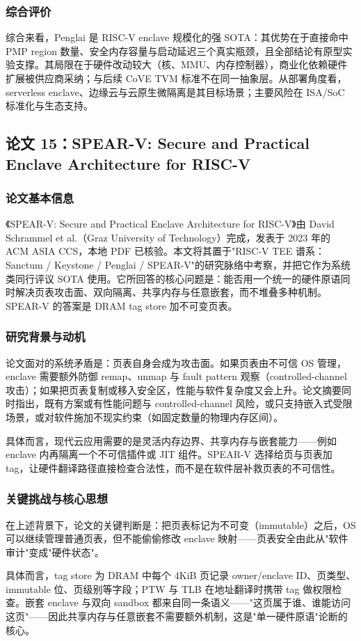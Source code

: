 \documentclass[11pt]{ctexart}
\begin{document}
\subsubsection{综合评价}
综合来看，Penglai 是 RISC-V enclave 规模化的强 SOTA：其优势在于直接命中 PMP region 数量、安全内存容量与启动延迟三个真实瓶颈，且全部结论有原型实验支撑。其局限在于硬件改动较大（核、MMU、内存控制器），商业化依赖硬件扩展被供应商采纳；与后续 CoVE TVM 标准不在同一抽象层。从部署角度看，serverless enclave、边缘云与云原生微隔离是其目标场景；主要风险在 ISA/SoC 标准化与生态支持。\par
\subsection{论文 15：SPEAR-V: Secure and Practical Enclave Architecture for RISC-V}
\subsubsection{论文基本信息}
《SPEAR-V: Secure and Practical Enclave Architecture for RISC-V》由 David Schrammel et al.（Graz University of Technology）完成，发表于 2023 年的 ACM ASIA CCS，本地 PDF 已核验。本文将其置于"RISC-V TEE 谱系：Sanctum / Keystone / Penglai / SPEAR-V"的研究脉络中考察，并把它作为系统类同行评议 SOTA 使用。它所回答的核心问题是：能否用一个统一的硬件原语同时解决页表攻击面、双向隔离、共享内存与任意嵌套，而不堆叠多种机制。SPEAR-V 的答案是 DRAM tag store 加不可变页表。\cite{schrammel2023spearv}\par
\subsubsection{研究背景与动机}
论文面对的系统矛盾是：页表自身会成为攻击面。如果页表由不可信 OS 管理，enclave 需要额外防御 remap、unmap 与 fault pattern 观察（controlled-channel 攻击）；如果把页表复制或移入安全区，性能与软件复杂度又会上升。论文摘要同时指出，既有方案或有性能问题与 controlled-channel 风险，或只支持嵌入式受限场景，或对软件施加不现实约束（如固定数量的物理内存区间）。\par
具体而言，现代云应用需要的是灵活内存边界、共享内存与嵌套能力——例如 enclave 内再隔离一个不可信插件或 JIT 组件。SPEAR-V 选择给页与页表加 tag，让硬件翻译路径直接检查合法性，而不是在软件层补救页表的不可信性。\par
\subsubsection{关键挑战与核心思想}
在上述背景下，论文的关键判断是：把页表标记为不可变（immutable）之后，OS 可以继续管理普通页表，但不能偷偷修改 enclave 映射——页表安全由此从"软件审计"变成"硬件状态"。\par
具体而言，tag store 为 DRAM 中每个 4KiB 页记录 owner/enclave ID、页类型、immutable 位、页级别等字段；PTW 与 TLB 在地址翻译时携带 tag 做权限检查。嵌套 enclave 与双向 sandbox 都来自同一条语义——"这页属于谁、谁能访问这页"——因此共享内存与任意嵌套不需要额外机制，这是"单一硬件原语"论断的核心。\par
\end{document}
